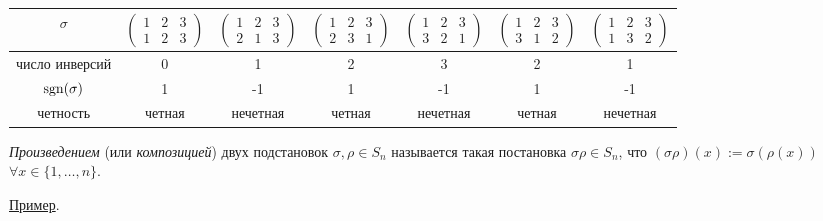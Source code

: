 \begin{table}[!ht]
    \begin{tabular}{c|c|c|c|c|c|c}
        $\sigma$ & $\begin{pmatrix} 1 & 2 & 3 \\ 1 & 2 & 3 \end{pmatrix}$ & $\begin{pmatrix} 1 & 2 & 3 \\ 2 & 1 & 3 \end{pmatrix}$ & $\begin{pmatrix} 1 & 2 & 3 \\ 2 & 3 & 1 \end{pmatrix}$ & $\begin{pmatrix} 1 & 2 & 3 \\ 3 & 2 & 1 \end{pmatrix}$ & $\begin{pmatrix} 1 & 2 & 3 \\ 3 & 1 & 2 \end{pmatrix}$ & $\begin{pmatrix} 1 & 2 & 3 \\ 1 & 3 & 2 \end{pmatrix}$ \\
        \hline
        число инверсий & 0 & 1 & 2 & 3 & 2 & 1\\
        \hline
        $\operatorname{\mathop{\mathrm{sgn}}}(\sigma)$ & 1 & -1 & 1 & -1 & 1 & -1 \\
        \hline
        четность & четная & нечетная & четная & нечетная & четная & нечетная
    \end{tabular}
\end{table}

\begin{comment}
    число инверсий в $\sigma \in S_n \leq \binom{n}{2} = \frac{n(n-1)}{2}$, равенство достигается при
    $\sigma = \begin{pmatrix}
        1 & 2 & \dots & n \\
        n & n-1 & \dots & 1
    \end{pmatrix}$
\end{comment}

\begin{definition}
    \textit{Произведением} (или \textit{композицией}) двух подстановок $\sigma, \rho \in S_n$ называется такая постановка $\sigma \rho \in S_n$, что $(\sigma \rho)(x) := \sigma (\rho (x))$ $\forall x \in \{1, \dots, n\}$.
\end{definition}

\underline{Пример}.


